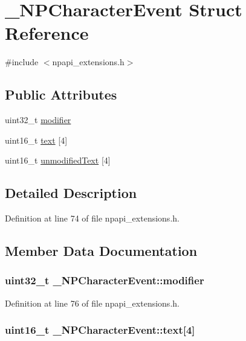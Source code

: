 \hypertarget{struct___n_p_character_event}{
\section{\_\-NPCharacterEvent Struct Reference}
\label{struct___n_p_character_event}
}


{\ttfamily \#include $<$npapi\_\-extensions.h$>$}

\subsection*{Public Attributes}
\begin{DoxyCompactItemize}
\item 
uint32\_\-t \hyperlink{struct___n_p_character_event_a5061717ac03715283f03a68d4fc39299}{modifier}
\item 
uint16\_\-t \hyperlink{struct___n_p_character_event_a0ab545dd1b8e1cabcb01bcca0ab4b058}{text} \mbox{[}4\mbox{]}
\item 
uint16\_\-t \hyperlink{struct___n_p_character_event_aeee174e5d5a95049110b4b17c6e57cd3}{unmodifiedText} \mbox{[}4\mbox{]}
\end{DoxyCompactItemize}


\subsection{Detailed Description}


Definition at line 74 of file npapi\_\-extensions.h.



\subsection{Member Data Documentation}
\hypertarget{struct___n_p_character_event_a5061717ac03715283f03a68d4fc39299}{
\subsubsection[{modifier}]{\setlength{\rightskip}{0pt plus 5cm}uint32\_\-t {\bf \_\-NPCharacterEvent::modifier}}}
\label{struct___n_p_character_event_a5061717ac03715283f03a68d4fc39299}


Definition at line 76 of file npapi\_\-extensions.h.

\hypertarget{struct___n_p_character_event_a0ab545dd1b8e1cabcb01bcca0ab4b058}{
\subsubsection[{text}]{\setlength{\rightskip}{0pt plus 5cm}uint16\_\-t {\bf \_\-NPCharacterEvent::text}\mbox{[}4\mbox{]}}}
\label{struct___n_p_character_event_a0ab545dd1b8e1cabcb01bcca0ab4b058}


